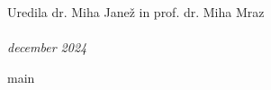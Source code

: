 \documentclass[graybox, envcountchap]{svmult}
\begin{document}
\large Uredila dr. Miha Janež in prof. dr. Miha Mraz\\
\\
\normalsize \emph{december 2024}




%
%
%


\tableofcontents
%
%


%
{main}

%

%
%



\backmatter





\end{document}
